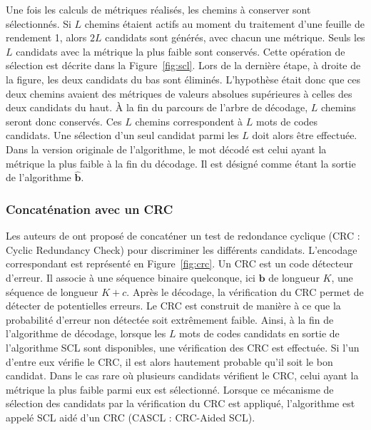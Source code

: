 Une fois les calculs de métriques réalisés, les chemins à conserver sont sélectionnés. Si $L$ chemins étaient actifs au moment du traitement d'une feuille de rendement 1, alors $2L$ candidats sont générés, avec chacun une métrique. Seuls les $L$ candidats avec la métrique la plus faible sont conservés. Cette opération de sélection est décrite dans la Figure~\ref{fig:scl}. Lors de la dernière étape, à droite de la figure, les deux candidats du bas sont éliminés. L'hypothèse était donc que ces deux chemins avaient des métriques de valeurs absolues supérieures à celles des deux candidats du haut. \`A la fin du parcours de l'arbre de décodage, $L$ chemins seront donc conservés. Ces $L$ chemins correspondent à $L$ mots de codes candidats. Une sélection d'un seul candidat parmi les $L$ doit alors être effectuée. Dans la version originale de l'algorithme, le mot décodé est celui ayant la métrique la plus faible à la fin du décodage. Il est désigné comme étant la sortie de l'algorithme $\mathbold{\hat{b}}$.


\subsubsection{Concaténation avec un CRC}

Les auteurs de \cite{tal_how_2013} ont proposé de concaténer un test de redondance cyclique (CRC : Cyclic Redundancy Check) pour discriminer les différents candidats. L'encodage correspondant est représenté en Figure~\ref{fig:crc}. Un CRC est un code détecteur d'erreur. Il associe à une séquence binaire quelconque, ici $\mathbold{b}$ de longueur $K$, une séquence de longueur $K+c$. Après le décodage, la vérification du CRC permet de détecter de potentielles erreurs. Le CRC est construit de manière à ce que la probabilité d'erreur non détectée soit extrêmement faible.
Ainsi, à la fin de l'algorithme de décodage, lorsque les $L$ mots de codes candidats en sortie de l'algorithme SCL sont disponibles, une vérification des CRC est effectuée. Si l'un d'entre eux vérifie le CRC, il est alors hautement probable qu'il soit le bon candidat. Dans le cas rare où plusieurs candidats vérifient le CRC, celui ayant la métrique la plus faible parmi eux est sélectionné. Lorsque ce mécanisme de sélection des candidats par la vérification du CRC est appliqué, l'algorithme est appelé \og SCL aidé d'un CRC \fg (CASCL : CRC-Aided SCL).


